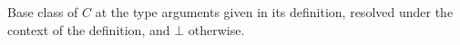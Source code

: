 Base class of $C$ at the type arguments given in its definition, resolved under the context of the definition, and
$\bot$ otherwise.
